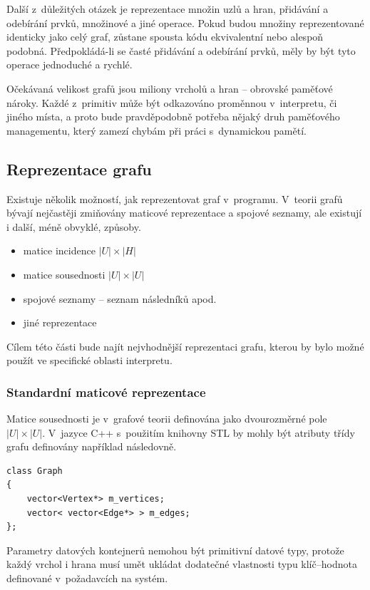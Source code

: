 \documentclass[11pt,twoside,a4paper]{book}
\begin{document}
Další z~důležitých otázek je reprezentace množin uzlů a hran, přidávání a odebírání prvků, množinové a jiné operace. Pokud budou množiny reprezentované identicky jako celý graf, zůstane spousta kódu ekvivalentní nebo alespoň podobná. Předpokládá-li se časté přidávání a odebírání prvků, měly by být tyto operace jednoduché a rychlé.

Očekávaná velikost grafů jsou miliony vrcholů a hran -- ob\-rov\-ské pa\-mě\-ťo\-vé nároky. Každé z~primitiv může být odkazováno proměnnou v~interpretu, či jiného místa, a proto bude pravděpodobně potřeba nějaký druh paměťového managementu, který zamezí chybám při práci s~dynamickou pamětí.


\subsection{Reprezentace grafu}

Existuje několik možností, jak reprezentovat graf v~programu. V~teorii grafů bývají nejčastěji zmi\-ňo\-vá\-ny maticové reprezentace a spojové seznamy, ale existují i další, méně obvyklé, způsoby.

\begin{itemize}
\item matice incidence $|U| \times |H|$
\item matice sousednosti $|U| \times |U|$
\item spojové seznamy -- seznam následníků apod.
\item jiné reprezentace
\end{itemize}

Cílem této části bude najít nejvhodnější reprezentaci grafu, kterou by bylo možné použít ve specifické oblasti interpretu.


\subsubsection{Standardní maticové reprezentace}

Matice sousednosti je v~grafové teorii definována jako dvourozměrné pole $|U| \times |U|$. V~jazyce C++ s~použitím knihovny STL by mohly být atributy třídy grafu definovány například následovně.

\begin{verbatim}
class Graph
{
    vector<Vertex*> m_vertices;
    vector< vector<Edge*> > m_edges;
};
\end{verbatim}

Parametry datových kontejnerů nemohou být primitivní datové typy, protože každý vrchol i hrana musí umět ukládat dodatečné vlastnosti typu klíč--hodnota definované v~požadavcích na systém.
\end{document}
